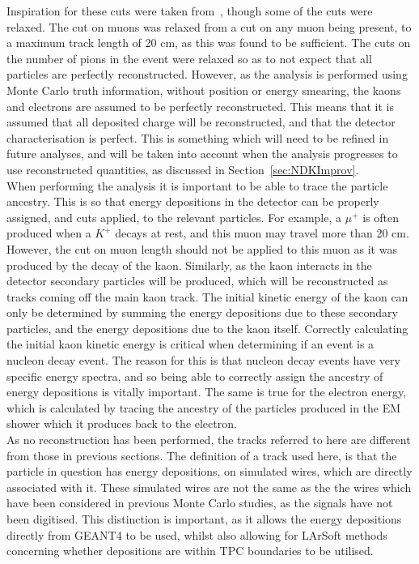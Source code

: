 Inspiration for these cuts were taken from~\citep{Bueno}, though some of the cuts were relaxed. The cut on muons was relaxed from a cut on any muon being present, to a maximum track length of 20 cm, as this was found to be sufficient. The cuts on the number of pions in the event were relaxed so as to not expect that all particles are perfectly reconstructed. However, as the analysis is performed using Monte Carlo truth information, without position or energy smearing, the kaons and electrons are assumed to be perfectly reconstructed. This means that it is assumed that all deposited charge will be reconstructed, and that the detector characterisation is perfect. This is something which will need to be refined in future analyses, and will be taken into account when the analysis progresses to use reconstructed quantities, as discussed in Section~\ref{sec:NDKImprov}. \\ 

When performing the analysis it is important to be able to trace the particle ancestry. This is so that energy depositions in the detector can be properly assigned, and cuts applied, to the relevant particles. For example, a $\mu^{+}$ is often produced when a $K^{+}$ decays at rest, and this muon may travel more than 20 cm. However, the cut on muon length should not be applied to this muon as it was produced by the decay of the kaon. Similarly, as the kaon interacts in the detector secondary particles will be produced, which will be reconstructed as tracks coming off the main kaon track. The initial kinetic energy of the kaon can only be determined by summing the energy depositions due to these secondary particles, and the energy depositions due to the kaon itself. Correctly calculating the initial kaon kinetic energy is critical when determining if an event is a nucleon decay event. The reason for this is that nucleon decay events have very specific energy spectra, and so being able to correctly assign the ancestry of energy depositions is vitally important. The same is true for the electron energy, which is calculated by tracing the ancestry of the particles produced in the EM shower which it produces back to the electron. \\

As no reconstruction has been performed, the tracks referred to here are different from those in previous sections. The definition of a track used here, is that the particle in question has energy depositions, on simulated wires, which are directly associated with it. These simulated wires are not the same as the the wires which have been considered in previous Monte Carlo studies, as the signals have not been digitised. This distinction is important, as it allows the energy depositions directly from GEANT4 to be used, whilst also allowing for LArSoft methods concerning whether depositions are within TPC boundaries to be utilised. \\

